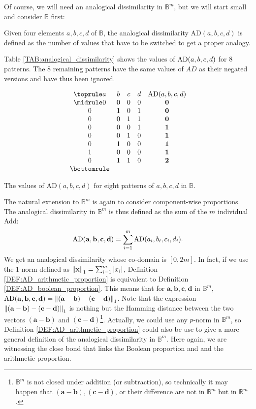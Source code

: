 Of course, we will need an analogical dissimilarity in $\mathbb{B}^m$, but we
will start small and consider $\mathbb{B}$ first:
\begin{definition}
  \label{DEF:AD_boolean_proportion}
  Given four elements $a, b, c, d$ of $\mathbb{B}$, the analogical
  dissimilarity $\text{AD}(a, b, c, d)$ is defined as the number of values that
  have to be switched to get a proper analogy.
\end{definition}
\noindent
Table \ref{TAB:analogical_dissimilarity} shows the values of $\AD(a, b, c, d)$
for 8 patterns. The $8$ remaining patterns have the same values of $AD$ as
their negated versions and have thus been ignored.
\begin{table}[t]
  \centering
  $$
  \begin{array}{ccccc}
    \toprule
    a & b & c & d &  \AD(a, b, c, d)\\
    \midrule
    0 & 0 & 0 & 0 &   \textbf{0}\\
    0 & 1 & 0 & 1 &   \textbf{0}\\
    0 & 0 & 1 & 1 &   \textbf{0}\\
    0 & 0 & 0 & 1 &   \textbf{1}\\
    0 & 0 & 1 & 0 &   \textbf{1}\\
    0 & 1 & 0 & 0 &   \textbf{1}\\
    1 & 0 & 0 & 0 &   \textbf{1}\\
    0 & 1 & 1 & 0 &   \textbf{2}\\
    \bottomrule
  \end{array}
  $$
  \caption{The values of $\text{AD}(a, b, c,d)$ for eight patterns of $a, b, c,
  d$ in $\mathbb{B}$.}
  \label{TAB:analogical_dissimilarity}
\end{table}
The natural extension to $\mathbb{B}^m$ is again to consider component-wise
proportions. The analogical dissimilarity in $\mathbb{B}^m$ is thus defined as
the sum of the $m$ individual Add:
$$\AD(\mathbf{a}, \mathbf{b},\mathbf{c},\mathbf{d}) = \sum\limits_{i=1}^m
\AD(a_i,b_i,c_i,d_i).$$
We get an analogical dissimilarity whose co-domain is $[0, 2m]$. In fact, if we
use the $1$-norm defined as $\norm{1}{\mathbf{x}} = \sum_{i = 1}^m |x_i|$,
Definition \ref{DEF:AD_arithmetic_proportion} is equivalent to Definition
\ref{DEF:AD_boolean_proportion}. This means that for $\mathbf{a},
\mathbf{b},\mathbf{c},\mathbf{d}$ in $\mathbb{B}^m$, $\AD(\mathbf{a},
\mathbf{b},\mathbf{c},\mathbf{d}) =
\norm{1}{(\mathbf{a}-\mathbf{b})-(\mathbf{c}-\mathbf{d})}$. Note that the
expression $\norm{1}{(\mathbf{a}-\mathbf{b})-(\mathbf{c}-\mathbf{d})}$ is
nothing but the Hamming distance between the two vectors
$(\mathbf{a}-\mathbf{b})$ and $(\mathbf{c}-\mathbf{d})$\footnote{$\mathbb{B}^m$
is not closed under addition (or subtraction), so technically it may happen that
$(\mathbf{a} - \mathbf{b}), (\mathbf{c} - \mathbf{d})$, or their difference are
not in $\mathbb{B}^m$ but in $\mathbb{R}^m$.}.
Actually, we could use any $p$-norm in $\mathbb{B}^m$, so
Definition \ref{DEF:AD_arithmetic_proportion} could also be use to give a more
general definition of the analogical dissimilarity in $\mathbb{B}^m$. Here
again, we are witnessing the close bond that links the Boolean proportion and
and the arithmetic proportion.

